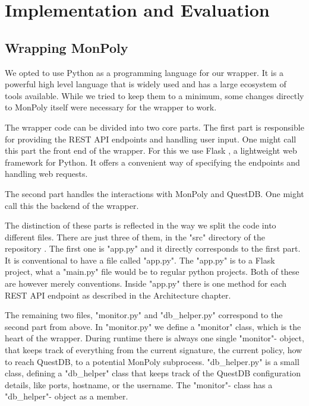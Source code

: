 \chapter{Implementation and Evaluation}

\section{Wrapping MonPoly}

We opted to use Python as a programming language for our wrapper.
It is a powerful high level language that is widely used and has a large ecosystem of tools available.
While we tried to keep them to a minimum, some changes directly to MonPoly itself were necessary for the wrapper to work.

The wrapper code can be divided into two core parts.
The first part is responsible for providing the REST API endpoints and handling user input.
One might call this part the front end of the wrapper.
For this we use Flask \cite{Flask}, a lightweight web framework for Python.
It offers a convenient way of specifying the endpoints and handling web requests.

The second part handles the interactions with MonPoly and QuestDB.
One might call this the backend of the wrapper.

The distinction of these parts is reflected in the way we split the code into different files.
There are just three of them, in the "src" directory of the repository \cite{git-wrapper}.
The first one is "app.py" and it directly corresponds to the first part.
It is conventional to have a file called "app.py".
The "app.py" is to a Flask project, what a "main.py" file would be to regular python projects.
Both of these are however merely conventions.
Inside "app.py" there is one method for each REST API endpoint as described in the Architecture chapter.

The remaining two files, "monitor.py" and "db\_helper.py" correspond to the second part from above.
In "monitor.py" we define a "monitor" class, which is the heart of the wrapper.
During runtime there is always one single "monitor"- object, that keeps track of everything from the current signature, the current policy, how to reach QuestDB, to a potential MonPoly subprocess.
"db\_helper.py" is a small class, defining a "db\_helper" class that keeps track of the QuestDB configuration details, like ports, hostname, or the username.
The "monitor"- class has a "db\_helper"- object as a member.

